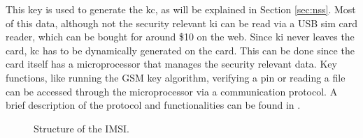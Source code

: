 This key is used to generate the \gls{kc}, as will be explained in Section \ref{sec:nss}.
Most of this data, although not the security relevant \gls{ki} can be read via a USB \gls{sim} card reader, which can be bought for around \$10 on the web.
Since \gls{ki} never leaves the card, \gls{kc} has to be dynamically generated on the card.
This can be done since the card itself has a microprocessor that manages the security relevant data.
Key functions, like running the GSM key algorithm, verifying a \gls{pin} or reading a file can be accessed through the microprocessor via a communication protocol.
A brief description of the protocol and functionalities can be found in \cite{kommsys2006}.

\begin{figure}
\centering
\caption{Structure of the IMSI.}
\label{fig:IMSI}
\end{figure}

